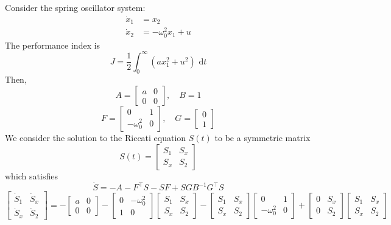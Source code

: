 \documentclass{article}
\begin{document}
\noindent
Consider the spring oscillator system:
\begin{align*}
    \dot{x}_1 &= x_2 \\
    \dot{x}_2 &= -\omega_0^2 x_1 + u
\end{align*}
The performance index is
\[J = \frac{1}{2}\int_{0}^{\infty}(ax_1^2+u^2)\text{ d}t\]
Then,
\[A = \left[\begin{matrix}
    a & 0 \\
    0 & 0
\end{matrix}\right], \quad B = 1\]
\[F = \left[\begin{matrix}
    0 & 1 \\
    -\omega_0^2 & 0
\end{matrix}\right], \quad G = \left[\begin{matrix}
    0 \\ 1
\end{matrix}\right]\]
We consider the solution to the Riccati equation $S(t)$ to be a symmetric matrix
\[S(t) = \left[\begin{matrix}
    S_1 & S_x \\
    S_x & S_2
\end{matrix}\right]\]
which satisfies
\[\dot{S} = -A - F^\top S - SF + SGB^{-1}G^\top S\]
\[\left[\begin{matrix}
    \dot{S}_1 & \dot{S}_x \\
    \dot{S}_x & \dot{S}_2
\end{matrix}\right] = -\left[\begin{matrix}
    a & 0 \\
    0 & 0
\end{matrix}\right] - \left[\begin{matrix}
    0 & -\omega_0^2 \\
    1 & 0
\end{matrix}\right]\left[\begin{matrix}
    S_1 & S_x \\
    S_x & S_2
\end{matrix}\right] - \left[\begin{matrix}
    S_1 & S_x \\
    S_x & S_2
\end{matrix}\right]\left[\begin{matrix}
    0 & 1 \\
    -\omega_0^2 & 0
\end{matrix}\right] + \left[\begin{matrix}
    0 & S_x \\
    0 & S_2
\end{matrix}\right]\left[\begin{matrix}
    S_1 & S_x \\
    S_x & S_2
\end{matrix}\right]\]
\end{document}
